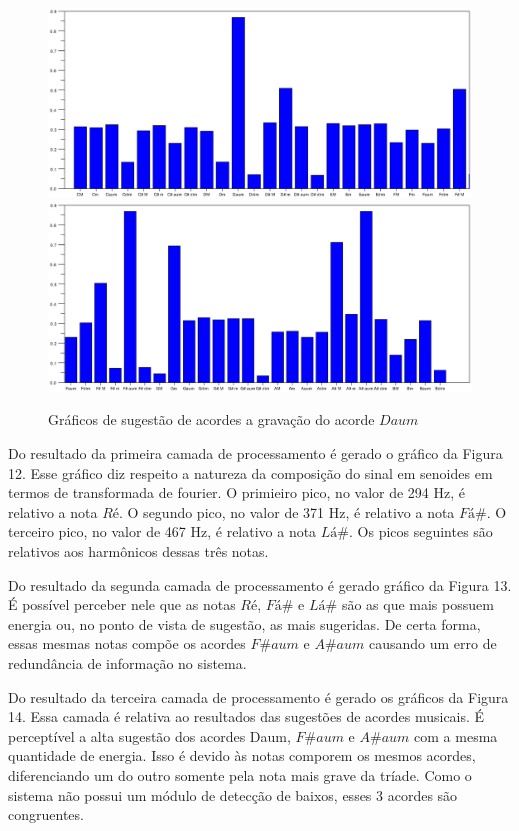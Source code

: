 \begin{figure}[h]
	\centering
		\includegraphics[keepaspectratio=true,scale=0.49]{figuras/Dm/acordes_1_Daum.eps}
		\includegraphics[keepaspectratio=true,scale=0.49]{figuras/Dm/acordes_2_Daum.eps}
	\caption{Gráficos de sugestão de acordes a gravação do acorde $Daum$}
\end{figure}
\newpage

Do resultado da primeira camada de processamento é gerado o gráfico da Figura 12. Esse gráfico diz respeito a natureza da composição do sinal em senoides em termos de transformada de fourier. O primieiro pico, no valor de 294 Hz, é relativo a nota $Ré$. O segundo pico, no valor de 371 Hz, é relativo a nota $Fá\#$. O terceiro pico, no valor de 467 Hz, é relativo a nota $Lá\#$. Os picos seguintes são relativos aos harmônicos dessas três notas. 

Do resultado da segunda camada de processamento é gerado gráfico da Figura 13. É possível perceber nele que as notas $Ré$, $Fá\#$ e $Lá\#$ são as que mais possuem energia ou, no ponto de vista de sugestão, as mais sugeridas. De certa forma, essas mesmas notas compõe os acordes $F\#aum$ e $A\#aum$ causando um erro de redundância de informação no sistema.  

Do resultado da terceira camada de processamento é gerado os gráficos da Figura 14. Essa camada é relativa ao resultados das sugestões de acordes musicais. É perceptível a alta sugestão dos acordes Daum, $F\#aum$ e $A\#aum$ com a mesma quantidade de energia. Isso é devido às notas comporem os mesmos acordes, diferenciando um do outro somente pela nota mais grave da tríade. Como o sistema não possui um módulo de detecção de baixos, esses 3 acordes são congruentes.



